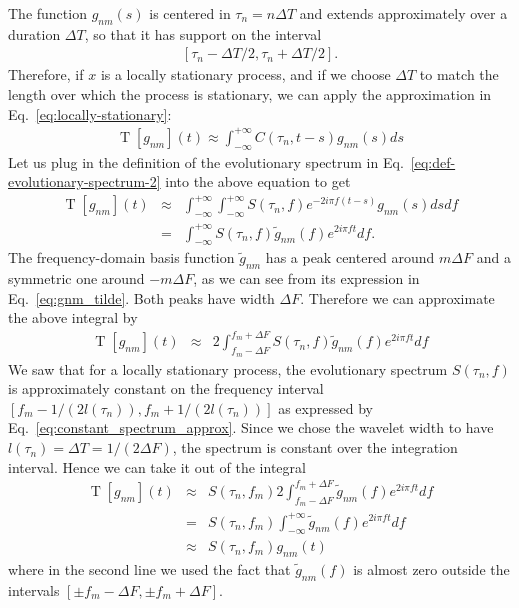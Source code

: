 \documentclass{article}
\begin{document}
The function $g_{nm}(s)$ is centered in $\tau_n = n \Delta T$ and extends approximately over a duration $ \Delta T$, so that it has support on the interval 
\begin{eqnarray}
    \left[ \tau_n - \Delta T / 2, \tau_n + \Delta T / 2 \right].
\end{eqnarray}
Therefore, if $x$ is a locally stationary process, and if we choose $\Delta T$ to match the length over which the process is stationary, we can apply the approximation in Eq.~\eqref{eq:locally-stationary}:
\begin{eqnarray}
    \operatorname{T}[g_{nm}](t) \approx \int_{-\infty}^{+\infty} C(\tau_n, t-s) g_{nm}(s) ds
\end{eqnarray}
Let us plug in the definition of the evolutionary spectrum in Eq.~\eqref{eq:def-evolutionary-spectrum-2} into the above equation to get
\begin{eqnarray}
    \operatorname{T}[g_{nm}](t) & \approx & \int_{-\infty}^{+\infty} \int_{-\infty}^{+\infty}  S(\tau_n, f) e^{-2 i \pi f  (t-s)} g_{nm}(s) ds df \nonumber \\
    & = & \int_{-\infty}^{+\infty} S(\tau_n, f) \tilde{g}_{nm}(f) e^{2 i \pi f t}  df.
\end{eqnarray}
The frequency-domain basis function $\tilde{g}_{nm}$ has a peak centered around $m\Delta F$ and a symmetric one around $-m \Delta F$, as we can see from its expression in Eq.~\eqref{eq:gnm_tilde}. Both peaks have width $\Delta F$. Therefore we can approximate the above integral by
\begin{eqnarray}
    \operatorname{T}[g_{nm}](t) & \approx & 2 \int_{f_m -\Delta F}^{f_m +\Delta F} S(\tau_n, f) \tilde{g}_{nm}(f) e^{2 i \pi f t}  df
\end{eqnarray}
We saw that for a locally stationary process, the evolutionary spectrum $S(\tau_n, f)$ is approximately constant on the frequency interval $[f_m - 1/(2 l(\tau_n)), f_m + 1/(2l(\tau_n))]$ as expressed by Eq.~\eqref{eq:constant_spectrum_approx}. Since we chose the wavelet width to have $l(\tau_n) = \Delta T = 1/(2\Delta F)$, the spectrum is constant over the integration interval. Hence we can take it out of the integral
\begin{eqnarray}
    \operatorname{T}[g_{nm}](t) & \approx & S(\tau_n, f_m)  2 \int_{f_m -\Delta F}^{f_m +\Delta F}\tilde{g}_{nm}(f) e^{2 i \pi f t}  df \nonumber \\
    & = & S(\tau_n, f_m) \int_{-\infty}^{+\infty} \tilde{g}_{nm}(f) e^{2 i \pi f t}  df \nonumber \\
    & \approx & S(\tau_n, f_m) g_{nm}(t)
\end{eqnarray}
where in the second line we used the fact that $\tilde{g}_{nm}(f)$ is almost zero outside the intervals $[\pm f_m - \Delta F, \pm f_m + \Delta F]$.
\end{document}
